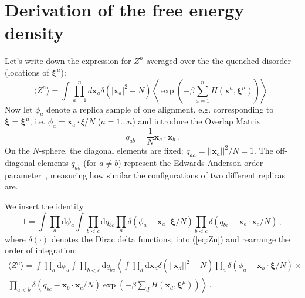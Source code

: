 \documentclass{article}
\newcommand{\dd}{{\mathrm{d}}}
\theoremstyle{plain}
\theoremstyle{definition}
\theoremstyle{remark}
\begin{document}
\nocite{langley00}




\newpage
\appendix
\onecolumn
\section{Derivation of the free energy density}

Let's write down the expression for $Z^n$ averaged over the the quenched disorder (locations of $\bm{\xi}^\mu$):
\begin{equation}
    \langle Z^n \rangle = \int \prod_{a=1}^n d\bm{x}_a \delta(|\bm{x}_a|^2 - N) \left\langle \exp\left(-\beta \sum_{a=1}^n H(\bm{x}^a, \bm{\xi}^\mu)\right) \right\rangle\,.
    \label{eq:Zn}
\end{equation}
Now let $\phi_a$ denote a replica sample of one alignment, e.g. corresponding to $\bm{\xi} = \bm{\xi}^\mu$, i.e. $\phi_a = \bm{x}_a \cdot \xi /N$ ($a=1\dots n$) and introduce the Overlap Matrix 
\begin{equation}
    q_{ab} = \frac{1}{N} \bm{x}_a \cdot \bm{x}_b\,.
\end{equation}
On the $N$-sphere, the diagonal elements are fixed: $q_{aa} =  ||\bm{x}_a||^2/N = 1$. The off-diagonal elements $q_{ab}$ (for $a \neq b$) represent the Edwards-Anderson order parameter~\cite{ea75}, measuring how similar the configurations of two different replicas are.

We insert the identity 
\begin{equation}
1 = \int \prod_a \dd \phi_a \int \prod_{b<c} \dd q_{bc} \prod_a \delta\left(\phi_a - \bm{x}_a \cdot \bm{\xi}/N\right) \prod_{b<c} \delta\left(q_{bc} - \bm{x}_b \cdot \bm{x}_c/N\right)\,,
\end{equation}
where $\delta(\cdot)$ denotes the Dirac delta functions, into (\ref{eq:Zn}) and rearrange the order of integration:
\begin{multline}
\langle Z^n \rangle = \int \prod_a \dd \phi_a \int \prod_{b<c}  \dd q_{bc} \left\langle \int \prod_d \dd \bm{x}_d \delta(||\bm{x}_d||^2 - N) \prod_a \delta(\phi_a - \bm{x}_a \cdot \bm{\xi}/N) \right. \times \\
\left. \prod_{a<b} \delta(q_{bc} - \bm{x}_b \cdot \bm{x}_c/N) \exp\left(-\beta \sum_d H(\bm{x}_d, \bm{\xi}^\mu)\right) \right\rangle \,.
\end{multline}
\end{document}
